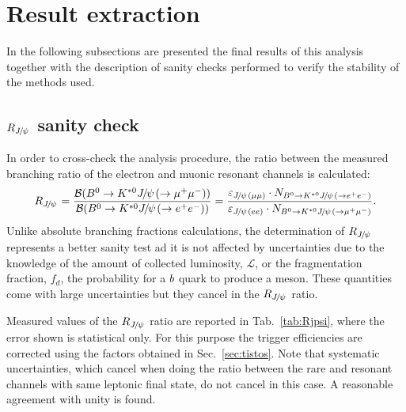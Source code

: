 \section{Result extraction}
\label{sec:RKst_result}

In the following subsections are presented the final results of this analysis
together with the description of sanity checks performed to verify the stability
of the methods used.

\subsection{$R_{\jpsi}$ sanity check}
\label{sec:Rjpsi}

In order to cross-check the analysis procedure, the ratio between the
measured branching ratio of the electron and muonic resonant channels is calculated:
%
\begin{equation}
R_{\jpsi} = \frac{\BR(\Bz\to\Kstarz\jpsi(\to \mumu))} {\BR(\Bz\to\Kstarz\jpsi(\to \epem))} 
= \frac{\varepsilon_{\jpsi(\mu\mu)} \cdot N_{\Bz\to\Kstarz\jpsi(\to \epem)}}{\varepsilon_{\jpsi(ee)} 
\cdot N_{\Bz\to\Kstarz\jpsi(\to \mumu)}}.
\end{equation}
%
Unlike absolute branching fractions calculations, the determination of $R_{\jpsi}$ represents a better
sanity test ad it is not affected by uncertainties due to the knowledge of the amount of collected 
luminosity, $\mathcal{L}$, or the fragmentation fraction, $f_d$, the probability for a ${b}$
quark to produce a \Bz meson. These quantities come with large uncertainties but they cancel
in the $R_{\jpsi}$ ratio.

%
%


Measured values of the $R_{\jpsi}$ ratio are reported in Tab.~\ref{tab:Rjpsi}, where the error 
shown is statistical only. For this purpose the trigger efficiencies are corrected using the 
factors obtained in Sec.~\ref{sec:tistos}. Note that systematic uncertainties, 
which cancel when doing the ratio between the rare and
resonant channels with same leptonic final state, do not cancel in this case.
A reasonable agreement with unity is found.

